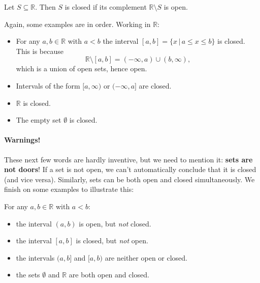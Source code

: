 \documentclass[
  12pt,
  a4paper]{extarticle}
\providecommand{\tightlist}{%
  \setlength{\itemsep}{0pt}\setlength{\parskip}{0pt}}
\theoremstyle{plain}
\theoremstyle{plain}
\theoremstyle{plain}
\theoremstyle{plain}
\theoremstyle{plain}
\theoremstyle{definition}
\theoremstyle{definition}
\theoremstyle{definition}
\theoremstyle{remark}
\let\BeginKnitrBlock\begin \let\EndKnitrBlock\end
\renewcommand{\;}{\,}
\begin{document}
\BeginKnitrBlock{definition}[Closed Set]
{\label{def:def5} }Let \(S \subseteq \mathbb{R}\). Then \(S\) is closed if its complement \(\mathbb{R}\setminus S\) is open.
\EndKnitrBlock{definition}
Again, some examples are in order. Working in \(\mathbb{R}\):

\begin{itemize}
\tightlist
\item
  For any \(a,b \in \mathbb{R}\) with \(a < b\) the interval \([a,b] = \lbrace x \;\lvert\; a \leq x \leq b \rbrace\) is closed. This is because \[\mathbb{R}\setminus[a,b] = (-\infty,a)\cup(b,\infty),\] which is a union of open sets, hence open.
\item
  Intervals of the form \([a, \infty)\) or \((-\infty, a]\) are closed.
\item
  \(\mathbb{R}\) is closed.
\item
  The empty set \(\emptyset\) is closed.
\end{itemize}

\hypertarget{warnings}{%
\paragraph*{Warnings!}\label{warnings}}

These next few words are hardly inventive, but we need to mention it: \textbf{sets are not doors}! If a set is not open, we can't automatically conclude that it is closed (and vice versa). Similarly, sets can be both open and closed simultaneously. We finish on some examples to illustrate this:

For any \(a,b \in \mathbb{R}\) with \(a < b\):

\begin{itemize}
\tightlist
\item
  the interval \((a,b)\) is open, but \emph{not} closed.
\item
  the interval \([a,b]\) is closed, but \emph{not} open.
\item
  the intervals \((a,b]\) and \([a,b)\) are neither open or closed.
\item
  the sets \(\emptyset\) and \(\mathbb{R}\) are both open and closed.
\end{itemize}
\end{document}
